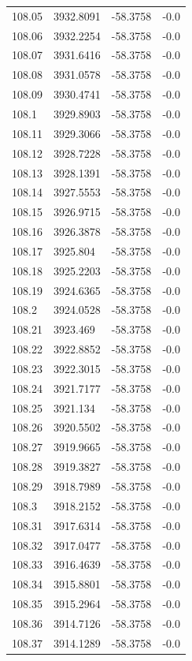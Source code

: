 \begin{table}[H]
\begin{tabular}{llll}
108.05 & 3932.8091 & -58.3758 & -0.0 \\
108.06 & 3932.2254 & -58.3758 & -0.0 \\
108.07 & 3931.6416 & -58.3758 & -0.0 \\
108.08 & 3931.0578 & -58.3758 & -0.0 \\
108.09 & 3930.4741 & -58.3758 & -0.0 \\
108.1 & 3929.8903 & -58.3758 & -0.0 \\
108.11 & 3929.3066 & -58.3758 & -0.0 \\
108.12 & 3928.7228 & -58.3758 & -0.0 \\
108.13 & 3928.1391 & -58.3758 & -0.0 \\
108.14 & 3927.5553 & -58.3758 & -0.0 \\
108.15 & 3926.9715 & -58.3758 & -0.0 \\
108.16 & 3926.3878 & -58.3758 & -0.0 \\
108.17 & 3925.804 & -58.3758 & -0.0 \\
108.18 & 3925.2203 & -58.3758 & -0.0 \\
108.19 & 3924.6365 & -58.3758 & -0.0 \\
108.2 & 3924.0528 & -58.3758 & -0.0 \\
108.21 & 3923.469 & -58.3758 & -0.0 \\
108.22 & 3922.8852 & -58.3758 & -0.0 \\
108.23 & 3922.3015 & -58.3758 & -0.0 \\
108.24 & 3921.7177 & -58.3758 & -0.0 \\
108.25 & 3921.134 & -58.3758 & -0.0 \\
108.26 & 3920.5502 & -58.3758 & -0.0 \\
108.27 & 3919.9665 & -58.3758 & -0.0 \\
108.28 & 3919.3827 & -58.3758 & -0.0 \\
108.29 & 3918.7989 & -58.3758 & -0.0 \\
108.3 & 3918.2152 & -58.3758 & -0.0 \\
108.31 & 3917.6314 & -58.3758 & -0.0 \\
108.32 & 3917.0477 & -58.3758 & -0.0 \\
108.33 & 3916.4639 & -58.3758 & -0.0 \\
108.34 & 3915.8801 & -58.3758 & -0.0 \\
108.35 & 3915.2964 & -58.3758 & -0.0 \\
108.36 & 3914.7126 & -58.3758 & -0.0 \\
108.37 & 3914.1289 & -58.3758 & -0.0 \\

\end{tabular}
\end{table}
